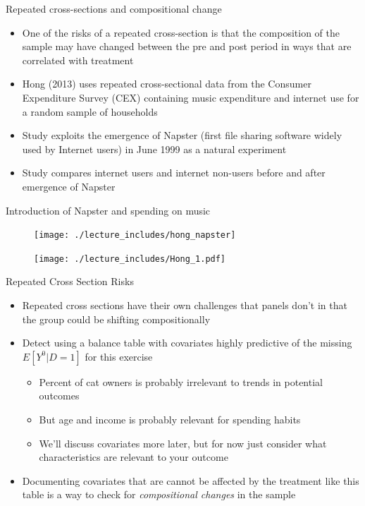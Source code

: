 \documentclass{beamer}
\begin{document}
\begin{frame}{Repeated cross-sections and compositional change}
	
	\begin{itemize}
	\item One of the risks of a repeated cross-section is that the composition of the sample may have changed between the pre and post period in ways that are correlated with treatment
	\item Hong (2013) uses repeated cross-sectional data from the Consumer Expenditure Survey (CEX) containing music expenditure and internet use for a random sample of households
	\item Study exploits the emergence of Napster (first file sharing software widely used by Internet users) in June 1999 as a natural experiment
	\item Study compares internet users and internet non-users before and after emergence of Napster
	\end{itemize}

\end{frame}

\begin{frame}{Introduction of Napster and spending on music}
	\begin{figure}
	\texttt{[image: ./lecture\_includes/hong\_napster]}
	\end{figure}
	
\end{frame}


\begin{frame}[plain]
	\begin{figure}
	\texttt{[image: ./lecture\_includes/Hong\_1.pdf]}
	\end{figure}
	
\end{frame}



\begin{frame}{Repeated Cross Section Risks}

\begin{itemize}
\item Repeated cross sections have their own challenges that panels don't in that the group could be shifting compositionally
\item Detect using a balance table with covariates highly predictive of the missing $E[Y^0|D=1]$ for this exercise 
	\begin{itemize}
	\item Percent of cat owners is probably irrelevant to trends in potential outcomes
	\item But age and income is probably relevant for spending habits
	\item We'll discuss covariates more later, but for now just consider what characteristics are relevant to your outcome
	\end{itemize}
\item Documenting covariates that are cannot be affected by the treatment like this table is a way to check for \emph{compositional changes} in the sample
\end{itemize}

\end{frame}
\end{document}
